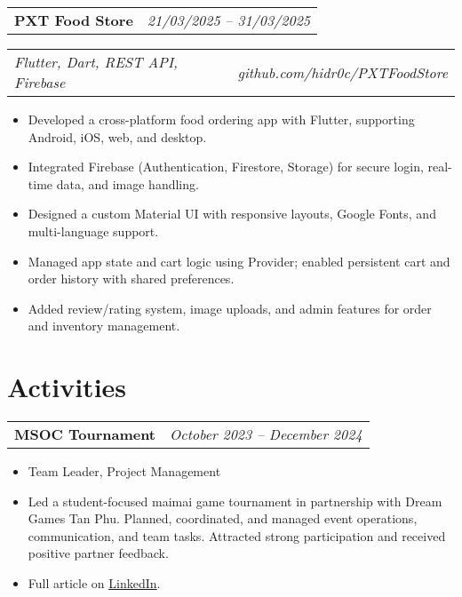 \documentclass[a4paper,11pt]{article}
\begin{document}
\begin{spacing}{1.05}
\begin{minipage}[t]{\linewidth}
  \begin{tabularx}{\linewidth}{@{}l r@{}}
    \textbf{PXT Food Store} & \hspace*{0.63\linewidth}\small\textit{21/03/2025 – 31/03/2025} \\
  \end{tabularx}
  \begin{tabularx}{\linewidth}{@{}l r@{}}
  \normalsize\textit{Flutter, Dart, REST API, Firebase} & \hspace*{0.39\linewidth} {\normalsize\textit{github.com/hidr0c/PXTFoodStore}}\\
  \end{tabularx}
 \begin{itemize} [nosep,leftmargin=1.2em,itemsep=2pt]
  \item Developed a cross-platform food ordering app with Flutter, supporting Android, iOS, web, and desktop.
  \item Integrated Firebase (Authentication, Firestore, Storage) for secure login, real-time data, and image handling.
  \item Designed a custom Material UI with responsive layouts, Google Fonts, and multi-language support.
  \item Managed app state and cart logic using Provider; enabled persistent cart and order history with shared preferences.
  \item Added review/rating system, image uploads, and admin features for order and inventory management.
\end{itemize}



  
\end{minipage}
\end{spacing}

\section{Activities}
\begin{spacing}{1.05}
\begin{tabularx}{\linewidth}{@{}l r@{}}
  \textbf{MSOC Tournament} & \hspace*{0.54\linewidth}\small\textit{October 2023 -- December 2024} \\
\end{tabularx}
\begin{itemize}[nosep,leftmargin=1.2em,itemsep=2pt]
  \item Team Leader, Project Management
  \item Led a student-focused maimai game tournament in partnership with Dream Games Tan Phu. Planned, coordinated, and managed event operations, communication, and team tasks. Attracted strong participation and received positive partner feedback. 
  \item Full article on \href{https://www.linkedin.com/feed/update/urn:li:activity:7300042302784233472/}{\underline{LinkedIn}}.
\end{itemize}
\end{spacing}



\vspace*{\fill}
\end{document}
